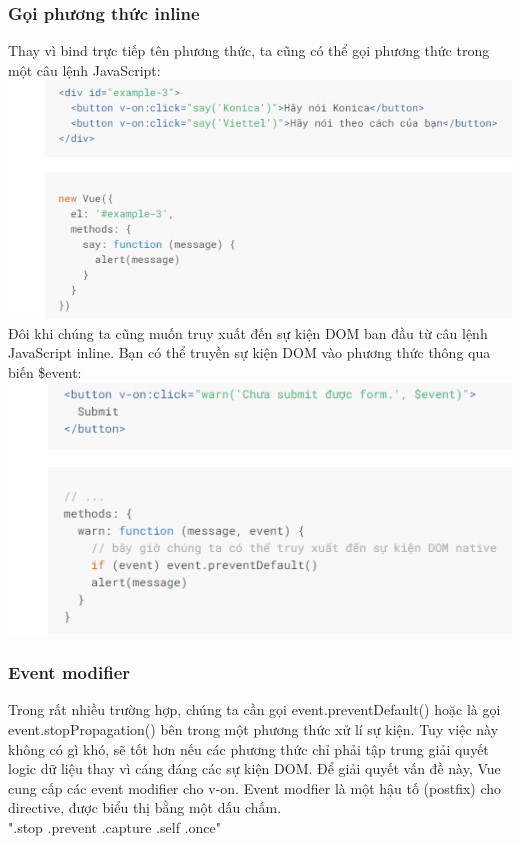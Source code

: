 \documentclass[12pt,a4paper]{report}
\begin{document}
\subsubsection{Gọi phương thức inline} Thay vì bind trực tiếp tên phương thức, ta cũng có thể gọi phương thức trong một câu lệnh JavaScript:\\\includegraphics[scale=.95]{56}\\Đôi khi chúng ta cũng muốn truy xuất đến sự kiện DOM ban đầu từ câu lệnh JavaScript inline. Bạn có thể truyền sự kiện DOM vào phương thức thông qua biến \$event: \\\includegraphics[scale=1]{57}
\subsubsection{Event modifier}Trong rất nhiều trường hợp, chúng ta cần gọi event.preventDefault() hoặc là gọi\\ event.stopPropagation() bên trong một phương thức xử lí sự kiện. Tuy việc này không có gì khó, sẽ tốt hơn nếu các phương thức chỉ phải tập trung giải quyết logic dữ liệu thay vì cáng đáng các sự kiện DOM. Để giải quyết vấn đề này, Vue cung cấp các event modifier cho v-on. Event modfier là một hậu tố (postfix) cho directive, được biểu thị bằng một dấu chấm. \\".stop \quad .prevent \quad .capture \quad .self \quad .once"
\end{document}
